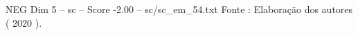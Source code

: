 \begin{textsample}{NEG Dim 5 – sc – Score -2.00 – sc/sc\_em\_54.txt}
Fonte : Elaboração dos autores ( 2020 ).

\end{textsample}
